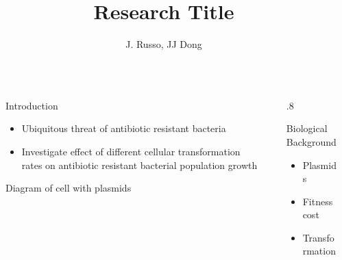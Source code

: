 \documentclass[final]{beamer}
\title{Research Title} %
\author{J. Russo, JJ Dong} %
\institute{Bucknell University, Department of Physics and Astronomy} %
\newlength{\sepwid}
\newlength{\onecolwid}
\begin{document}

\setlength{\belowcaptionskip}{2ex} %
\setlength\belowdisplayshortskip{2ex} %




\begin{frame}[t] %

\begin{block}

\begin{columns}[t] %
\begin{column}{4ex}\end{column} %

\begin{column}{\onecolwid}

  \begin{alertblock}{Introduction}
  \begin{itemize}
    \item Ubiquitous threat of antibiotic resistant bacteria
    \item Investigate effect of different cellular transformation rates on antibiotic
    resistant bacterial population growth
  \end{itemize}

  \begin{center}
    Diagram of cell with plasmids
  \end{center}
  \end{alertblock}
\end{column}

\begin{column}{\sepwid}\end{column} %

\begin{column}{.8\onecolwid}
  \begin{alertblock}{Biological Background}
    \begin{itemize}
      \item Plasmids
      \item Fitness cost
      \item Transformation
    \end{itemize}
  \end{alertblock}
\end{column}


\end{columns}
\end{block}
\end{frame}
\end{document}
